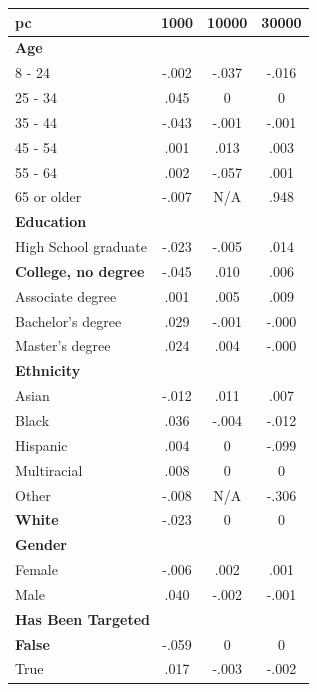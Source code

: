 \documentclass[11pt]{article}
\theoremstyle{definition}
\theoremstyle{plain}
\begin{document}
\begin{table}[t]
	\scriptsize
	\centering
	\begin{tabular}{l c c c}
		\toprule
		\textbf{\ac{pc}} & \textbf{1000} & \textbf{10000} & \textbf{30000} \\
		\midrule
		\multicolumn{4}{l}{\textbf{Age}} \\
		\midrule
		8 - 24 & -.002 & -.037 & -.016 \\
		25 - 34 & .045 & 0 & 0 \\
		35 - 44 & -.043 & -.001 & -.001 \\
		45 - 54 & .001 & .013 & .003 \\
		55 - 64 & .002 & -.057 & .001 \\
		65 or older & -.007 & N/A & .948 \\
		\midrule
		
		\multicolumn{4}{l}{\textbf{Education}} \\
		\midrule
		High School graduate & -.023 & -.005 & .014 \\
		\textbf{College, no degree} & -.045 & .010 & .006 \\
		Associate degree & .001 & .005 & .009 \\
		Bachelor's degree & .029 & -.001 & -.000 \\
		Master's degree & .024 & .004 & -.000 \\
		\midrule
		
		\multicolumn{4}{l}{\textbf{Ethnicity}} \\
		\midrule
		Asian & -.012 & .011 & .007 \\
		Black & .036 & -.004 & -.012 \\
		Hispanic & .004 & 0 & -.099 \\
		Multiracial & .008 & 0 & 0 \\
		Other & -.008 & N/A & -.306 \\
		\textbf{White} & -.023 & 0 & 0 \\
		\midrule
		
		\multicolumn{4}{l}{\textbf{Gender}} \\
		\midrule
		Female & -.006 & .002 & .001 \\
		Male & .040 & -.002 & -.001 \\
		\midrule
		
		\multicolumn{4}{l}{\textbf{Has Been Targeted}} \\
		\midrule
		\textbf{False} & -.059 & 0 & 0 \\
		True & .017 & -.003 & -.002 \\
		\midrule
		

\end{tabular}
\end{table}
\end{document}
